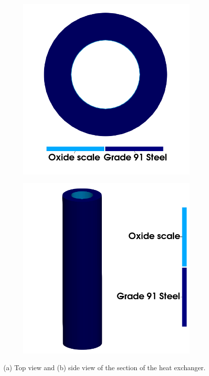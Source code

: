 \begin{figure}
  \centering
  \begin{subfigure}{0.4\textwidth}
    \centering
    \includegraphics[width=\textwidth]{Chapter5/figures/spallation/top_view}
    \caption{}
  \end{subfigure}
  \begin{subfigure}{0.4\textwidth}
    \centering
    \includegraphics[width=\textwidth]{Chapter5/figures/spallation/side_view}
    \caption{}
  \end{subfigure}
  \caption{(a) Top view and (b) side view of the section of the heat exchanger.}
  \label{fig: Chapter5/spallation/schematics}
\end{figure}
